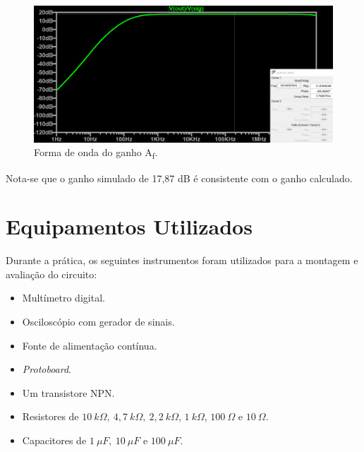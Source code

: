 \documentclass[journal, a4paper]{IEEEtran}
\begin{document}
    	\begin{figure}[H]
    		\begin{center}
    		\includegraphics[width=\columnwidth]{ganhoAf-novo.PNG}
    		\caption{Forma de onda do ganho A\textsubscript{f}.}
    		\label{ganho af simulação}
    		\end{center}
    	\end{figure}
    	
    \tab Nota-se que o ganho simulado de 17,87 dB é consistente com o ganho calculado.
    
\section{Equipamentos Utilizados}

    \tab Durante a prática, os seguintes instrumentos foram utilizados para a montagem e avaliação do circuito:
     \begin{itemize}
        \item Multímetro digital.
        
        \item Osciloscópio com gerador de sinais.
        
        \item Fonte de alimentação contínua.
        
        \item \textit{Protoboard}.
        
        \item Um transistore NPN.
        
        \item Resistores de $10 \: k\Omega,\: 4,7 \: k\Omega,\: 2,2 \: k\Omega$, $1 \: k\Omega$, $100 \: \Omega$ e $10 \: \Omega$.
        
        \item Capacitores de $1 \: \mu F,\: 10 \: \mu F$ e $100 \: \mu F$.
        
     \end{itemize}
        
\end{document}
